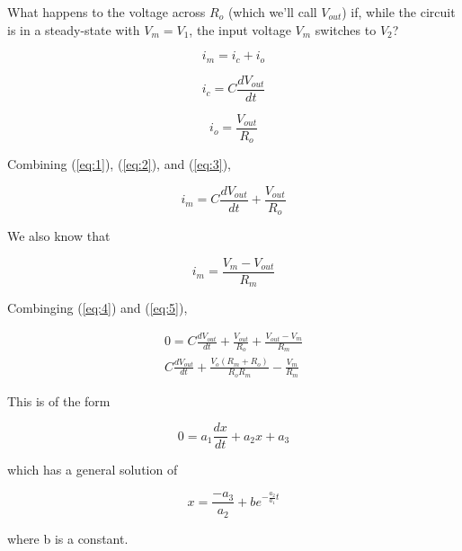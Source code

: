 \documentclass[12pt]{article}
\begin{document}
 

What happens to the voltage across $R_{o}$ (which we'll call $V_{out}$) if, while the circuit is in a steady-state with $V_{m} = V_{1}$, the input voltage $V_{m}$ switches to $V_{2}$?


\begin{equation} \label{eq:1} 
i_{m} = i_{c} + i_{o} 
\end{equation}

\begin{equation} \label{eq:2} 
i_{c} = C\frac{dV_{out}}{dt}
\end{equation}

\begin{equation} \label{eq:3} 
i_{o} = \frac{V_{out}}{R_{o}}
\end{equation}

Combining (\ref{eq:1}), (\ref{eq:2}), and (\ref{eq:3}),

\begin{equation} \label{eq:4} 
i_{m} = C\frac{dV_{out}}{dt} + \frac{V_{out}}{R_{o}}
\end{equation}

We also know that

\begin{equation} \label{eq:5} 
i_{m} = \frac{V_{m}-V_{out}}{R_{m}} 
\end{equation}

Combinging (\ref{eq:4}) and (\ref{eq:5}),

\begin{eqnarray*} \label{eq:6} 
0 = C\frac{dV_{out}}{dt} + \frac{V_{out}}{R_{o}} + \frac{V_{out}  - V_{m}}{R_{m}}\\
C\frac{dV_{out}}{dt} + \frac{V_{o}(R_{m} + R_{o})}{R_{o}R_{m}} - \frac{V_{m}}{R_{m}}
\end{eqnarray*}

This is of the form

\begin{equation} \label{eq:7}
0 = a_{1}\frac{dx}{dt} + a_{2}x + a_{3}
\end{equation}

which has a general solution of

\begin{equation} \label{eq:8}
x = \frac{-a_{3}}{a_{2}} + be^{-\frac{a_{2}}{a_{1}}t}
\end{equation}

where b is a constant.
\end{document}

